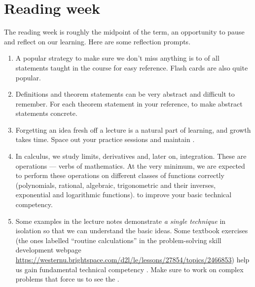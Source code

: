 \documentclass[../main.tex]{subfiles}
\begin{document}
 \section{Reading week}
  The reading week is roughly the midpoint of the term, an opportunity to pause and reflect on our learning. Here are some reflection prompts.

  \begin{enumerate}
    \item {} A popular strategy to make sure we don't miss anything is to  of all statements taught in the course for easy reference. Flash cards are also quite popular.

    \item {} Definitions and theorem statements can be very abstract and difficult to remember. For each theorem statement in your reference,  to make abstract statements concrete.

    \item {} Forgetting an idea fresh off a lecture is a natural part of learning, and growth takes time. Space out your practice sessions and maintain .

    \item {} In calculus, we study limits, derivatives and, later on, integration. These are operations --- verbs of mathematics. At the very minimum, we are expected to perform these operations on different classes of functions correctly (polynomials, rational, algebraic, trigonometric and their inverses, exponential and logarithmic functions).  to improve your basic technical competency.

    \item {} Some examples in the lecture notes demonstrate \emph{a single technique} in isolation so that we can understand the basic ideas. Some textbook exercises (the ones labelled ``routine calculations'' in the problem-solving skill development webpage \url{https://westernu.brightspace.com/d2l/le/lessons/27854/topics/2466853}) help us gain fundamental technical competency . Make sure to work on complex problems that force us to see the .


\end{enumerate}
\end{document}
